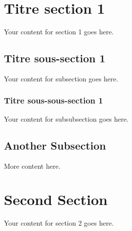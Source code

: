 \documentclass{article}
\begin{document}
\section{Titre section 1}
Your content for section 1 goes here.

\subsection{Titre sous-section 1}
Your content for subsection goes here.

\subsubsection{Titre sous-sous-section 1}
Your content for subsubsection goes here.

\subsection{Another Subsection}
More content here.

\section{Second Section}
Your content for section 2 goes here.
\end{document}
